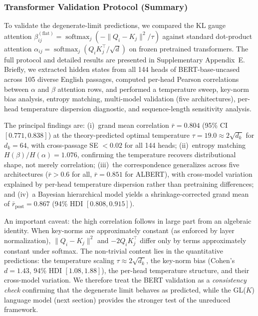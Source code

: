 \documentclass[twoside,11pt]{article}
\newcommand{\softmax}{\operatorname{softmax}}
\begin{document}
\subsubsection{Transformer Validation Protocol (Summary)}
\label{sec:bert_summary}
To validate the degenerate-limit predictions, we compared the KL gauge attention $\beta_{ij}^{(\mathrm{flat})} = \softmax_j(-\|Q_i - K_j\|^2/\tau)$ against standard dot-product attention $\alpha_{ij} = \softmax_j(Q_i K_j^\top / \sqrt{d})$ on frozen pretrained transformers. The full protocol and detailed results are presented in Supplementary Appendix~E. Briefly, we extracted hidden states from all 144 heads of BERT-base-uncased across 105 diverse English passages, computed per-head Pearson correlations between $\alpha$ and $\beta$ attention rows, and performed a temperature sweep, key-norm bias analysis, entropy matching, multi-model validation (five architectures), per-head temperature dispersion diagnostic, and sequence-length sensitivity analysis.

The principal findings are: (i)~grand mean correlation $\bar{r} = 0.804$ (95\% CI $[0.771, 0.838]$) at the theory-predicted optimal temperature $\tau = 19.0 \approx 2\sqrt{d_k}$ for $d_k = 64$, with cross-passage SE $< 0.02$ for all 144 heads; (ii)~entropy matching $H(\beta)/H(\alpha) = 1.076$, confirming the temperature recovers distributional shape, not merely correlation; (iii)~the correspondence generalizes across five architectures ($\bar{r} > 0.6$ for all, $\bar{r} = 0.851$ for ALBERT), with cross-model variation explained by per-head temperature dispersion rather than pretraining differences; and (iv)~a Bayesian hierarchical model yields a shrinkage-corrected grand mean of $\bar{r}_{\mathrm{post}} = 0.867$ (94\% HDI $[0.808, 0.915]$).

An important caveat: the high correlation follows in large part from an algebraic identity. When key-norms are approximately constant (as enforced by layer normalization), $\|Q_i - K_j\|^2$ and $-2Q_i K_j^\top$ differ only by terms approximately constant under softmax. The non-trivial content lies in the quantitative predictions: the temperature scaling $\tau \approx 2\sqrt{d_k}$, the key-norm bias (Cohen's $d = 1.43$, 94\% HDI $[1.08, 1.88]$), the per-head temperature structure, and their cross-model variation. We therefore treat the BERT validation as a \emph{consistency check} confirming that the degenerate limit behaves as predicted, while the GL($K$) language model (next section) provides the stronger test of the unreduced framework.
\end{document}
